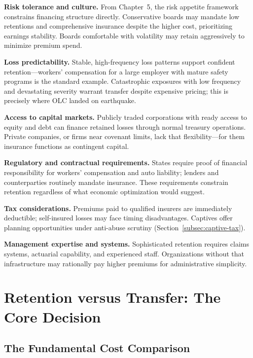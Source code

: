 \documentclass[11pt,openany]{book}
\begin{document}
\textbf{Risk tolerance and culture.} From Chapter~5,
the risk appetite framework constrains financing structure directly.
Conservative boards may mandate low retentions and comprehensive insurance
despite the higher cost, prioritizing earnings stability. Boards comfortable
with volatility may retain aggressively to minimize premium spend.

\textbf{Loss predictability.} Stable, high-frequency loss patterns support
confident retention---workers' compensation for a large employer with mature
safety programs is the standard example. Catastrophic exposures with low
frequency and devastating severity warrant transfer despite expensive
pricing; this is precisely where OLC landed on earthquake.

\textbf{Access to capital markets.} Publicly traded corporations with ready
access to equity and debt can finance retained losses through normal treasury
operations. Private companies, or firms near covenant limits, lack that
flexibility---for them insurance functions as contingent capital.

\textbf{Regulatory and contractual requirements.} States require proof of
financial responsibility for workers' compensation and auto liability;
lenders and counterparties routinely mandate insurance. These requirements
constrain retention regardless of what economic optimization would suggest.

\textbf{Tax considerations.} Premiums paid to qualified insurers are
immediately deductible; self-insured losses may face timing disadvantages.
Captives offer planning opportunities under anti-abuse scrutiny
(Section~\ref{subsec:captive-tax}).

\textbf{Management expertise and systems.} Sophisticated retention requires
claims systems, actuarial capability, and experienced staff. Organizations
without that infrastructure may rationally pay higher premiums for
administrative simplicity.

\section{Retention versus Transfer: The Core Decision}
\label{sec:retention-transfer}

\subsection{The Fundamental Cost Comparison}
\label{subsec:cost-comparison}
\end{document}
